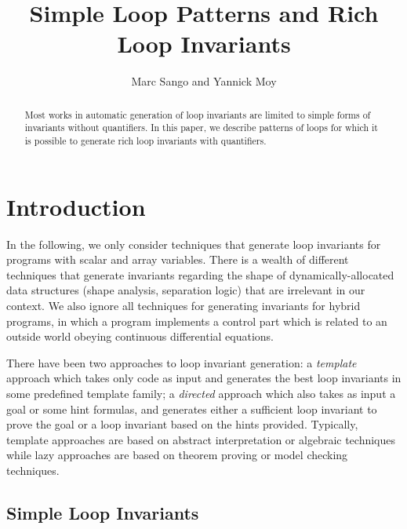 \documentclass[a4paper,10pt]{article}
\begin{document}
\title{Simple Loop Patterns and Rich Loop Invariants}
\author{Marc Sango and Yannick Moy}
\date{}

\maketitle

\begin{abstract}
  Most works in automatic generation of loop invariants are limited to simple
  forms of invariants without quantifiers. In this paper, we describe patterns
  of loops for which it is possible to generate rich loop invariants with
  quantifiers.
\end{abstract}

\section{Introduction}

In the following, we only consider techniques that generate loop invariants for
programs with scalar and array variables. There is a wealth of different
techniques that generate invariants regarding the shape of
dynamically-allocated data structures (shape analysis, separation logic) that
are irrelevant in our context. We also ignore all techniques for generating
invariants for hybrid programs, in which a program implements a control part
which is related to an outside world obeying continuous differential equations.

There have been two approaches to loop invariant generation: a
\textit{template} approach which takes only code as input and generates the
best loop invariants in some predefined template family; a \textit{directed}
approach which also takes as input a goal or some hint formulas, and generates
either a sufficient loop invariant to prove the goal or a loop invariant based
on the hints provided. Typically, template approaches are based on abstract
interpretation or algebraic techniques while lazy approaches are based on
theorem proving or model checking techniques.

\subsection{Simple Loop Invariants}
\end{document}
